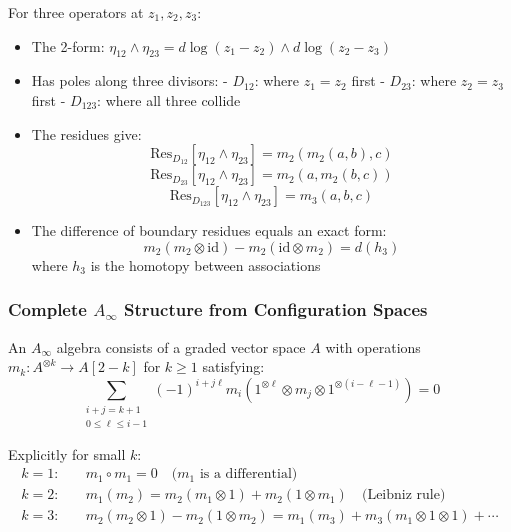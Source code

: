 \begin{example}
For three operators at $z_1, z_2, z_3$:
\begin{itemize}
\item The 2-form: $\eta_{12} \wedge \eta_{23} = d\log(z_1-z_2) \wedge d\log(z_2-z_3)$
\item Has poles along three divisors:
  - $D_{12}$: where $z_1 = z_2$ first
  - $D_{23}$: where $z_2 = z_3$ first  
  - $D_{123}$: where all three collide
\item The residues give:
$$\text{Res}_{D_{12}}[\eta_{12} \wedge \eta_{23}] = m_2(m_2(a,b),c)$$
$$\text{Res}_{D_{23}}[\eta_{12} \wedge \eta_{23}] = m_2(a,m_2(b,c))$$
$$\text{Res}_{D_{123}}[\eta_{12} \wedge \eta_{23}] = m_3(a,b,c)$$
\item The difference of boundary residues equals an exact form:
$$m_2(m_2 \otimes \text{id}) - m_2(\text{id} \otimes m_2) = d(h_3)$$
where $h_3$ is the homotopy between associations
\end{itemize}
\end{example}

\subsubsection{Complete $A_\infty$ Structure from Configuration Spaces}

\begin{definition}\label{def:a-infinity-complete}
An $A_\infty$ algebra consists of a graded vector space $A$ with operations $m_k: A^{\otimes k} \to A[2-k]$ for $k \geq 1$ satisfying:
$$\sum_{\substack{i+j=k+1 \\ 0 \leq \ell \leq i-1}} (-1)^{i+j\ell} m_i(1^{\otimes \ell} \otimes m_j \otimes 1^{\otimes(i-\ell-1)}) = 0$$

Explicitly for small $k$:
\begin{align}
k=1: &\quad m_1 \circ m_1 = 0 \quad \text{($m_1$ is a differential)} \\
k=2: &\quad m_1(m_2) = m_2(m_1 \otimes 1) + m_2(1 \otimes m_1) \quad \text{(Leibniz rule)} \\
k=3: &\quad m_2(m_2 \otimes 1) - m_2(1 \otimes m_2) = m_1(m_3) + m_3(m_1 \otimes 1 \otimes 1) + \cdots
\end{align}
\end{definition}

